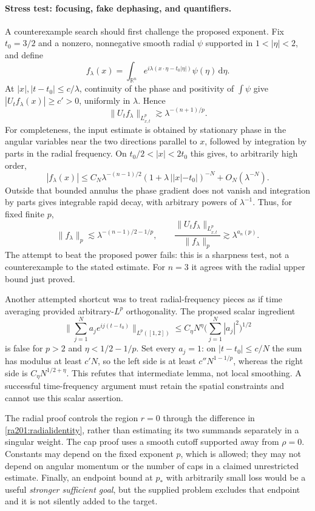 \documentclass[11pt]{article}
\newcommand{\R}{\mathbb{R}}
\newcommand{\dd}{\,\mathrm d}
\begin{document}
	\paragraph{Stress test: focusing, fake dephasing, and quantifiers.}
	A counterexample search should first challenge the proposed exponent.
	Fix $t_0=3/2$ and a nonzero, nonnegative smooth radial $\psi$ supported
	in $1<|\eta|<2$, and define
	\[
	f_\lambda(x)=\int_{\R^n}
	e^{i\lambda(x\cdot\eta-t_0|\eta|)}\psi(\eta)\dd\eta.
	\]
	At $|x|,|t-t_0|\leq c/\lambda$, continuity of the phase and positivity
	of $\int\psi$ give $|U_tf_\lambda(x)|\geq c'>0$, uniformly in
	$\lambda$. Hence
	\[
	\|U_tf_\lambda\|_{L^p_{x,t}}\gtrsim\lambda^{-(n+1)/p}.
	\]
	For completeness, the input estimate is obtained by stationary phase in
	the angular variables near the two directions parallel to $x$, followed
	by integration by parts in the radial frequency. On
	$t_0/2<|x|<2t_0$ this gives, to arbitrarily high order,
	\[
	|f_\lambda(x)|\leq C_N\lambda^{-(n-1)/2}
	(1+\lambda\,||x|-t_0|)^{-N}+O_N(\lambda^{-N}).
	\]
	Outside that bounded annulus the phase gradient does not vanish and
	integration by parts gives integrable rapid decay, with arbitrary
	powers of $\lambda^{-1}$. Thus, for fixed finite $p$,
	\[
	\|f_\lambda\|_p\lesssim
	\lambda^{-(n-1)/2-1/p},\qquad
	\frac{\|U_tf_\lambda\|_{L^p_{x,t}}}{\|f_\lambda\|_p}
	\gtrsim\lambda^{a_n(p)}.
	\]
	The attempt to beat the proposed power fails: this is a sharpness test,
	not a counterexample to the stated estimate. For $n=3$ it agrees with
	the radial upper bound just proved.
	
	Another attempted shortcut was to treat radial-frequency pieces as if
	time averaging provided arbitrary-$L^p$ orthogonality. The proposed
	scalar ingredient
	\[
	\Big\|\sum_{j=1}^{N}a_je^{ij(t-t_0)}\Big\|_{L^p([1,2])}
	\leq C_\eta N^\eta\Big(\sum_{j=1}^{N}|a_j|^2\Big)^{1/2}
	\]
	is false for $p>2$ and $\eta<1/2-1/p$. Set every $a_j=1$:
	on $|t-t_0|\leq c/N$ the sum has modulus at least $c'N$, so the
	left side is at least $c''N^{1-1/p}$, whereas the right side is
	$C_\eta N^{1/2+\eta}$. This refutes that intermediate lemma, not
	local smoothing. A successful time-frequency argument must retain the
	spatial constraints and cannot use this scalar assertion.
	
	The radial proof controls the region $r=0$ through the difference in
	\eqref{ra201:radialidentity}, rather than estimating its two summands
	separately in a singular weight. The cap proof uses a smooth cutoff
	supported away from $\rho=0$. Constants may depend on the fixed exponent
	$p$, which is allowed; they may not depend on angular momentum or the
	number of caps in a claimed unrestricted estimate. Finally, an
	endpoint bound at $p_*$ with arbitrarily small loss would be a useful
	\emph{stronger sufficient goal}, but the supplied problem excludes that
	endpoint and it is not silently added to the target.
	
\end{document}
